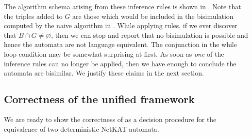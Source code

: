 \documentclass[acmsmall,dvipsnames,nonacm]{acmart}
\newcommand\NetKAT{\textsf{NetKAT}\xspace}
\begin{document}
The algorithm schema arising from these inference rules is shown in
.
Note that the triples added to $G$ are those which would be included in the
bisimulation computed by the naive algorithm in .
While applying rules, if we ever discover that $B \cap G \neq
\varnothing$, then we can stop and report that no bisimulation is possible and
hence the automata are not language equivalent.  The conjunction in
the while loop condition may be somewhat surprising at first. As soon as
\emph{one} of the inference rules can no longer be applied, then we have enough
to conclude the automata are bisimilar.  We justify these claims in the next section.

\subsection{Correctness of the unified framework}\label{sec:correct-unified}

We are ready to show the correctness of  as a decision
procedure for the equivalence of two deterministic \NetKAT
automata.
\end{document}
